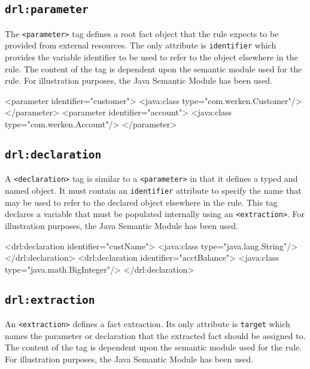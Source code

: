 \subsection{\texttt{drl:parameter}}

The \verb|<parameter>| tag defines a root fact object that the
rule expects to be provided from external resources.  The only
attribute is \verb|identifier| which provides the variable identifier
to be used to refer to the object elsewhere in the rule. The content
of the tag is dependent upon the semantic module used for the rule.
For illustration purposes, the Java Semantic Module has been used.

\begin{codelisting}
<parameter identifier="customer">
\textcolor{light}{  <java:class type="com.werken.Customer"/>}
</parameter>
<parameter identifier="account">
\textcolor{light}{  <java:class type="com.werken.Account"/>}
</parameter>
\end{codelisting}

\subsection{\texttt{drl:declaration}}

A \verb|<declaration>| tag is similar to a \verb|<parameter>| in
that it defines a typed and named object.  It must contain an
\verb|identifier| attribute to specify the name that may be used
to refer to the declared object elsewhere in the rule.  This tag
declares a variable that must be populated internally using an
\verb|<extraction>|.  For illustration purposes, the Java Semantic
Module has been used.

\begin{codelisting}
<drl:declaration identifier="custName">
\textcolor{light}{  <java:class type="java.lang.String"/>}
</drl:declaration>
<drl:declaration identifier="acctBalance">
\textcolor{light}{  <java:class type="java.math.BigInteger"/>}
</drl:declaration>
\end{codelisting}

\subsection{\texttt{drl:extraction}}

An \verb|<extraction>| defines a fact extraction.  Its only
attribute is \verb|target| which names the parameter or declaration
that the extracted fact should be assigned to.  The content
of the tag is dependent upon the semantic module used for the rule.
For illustration purposes, the Java Semantic Module has been used.

